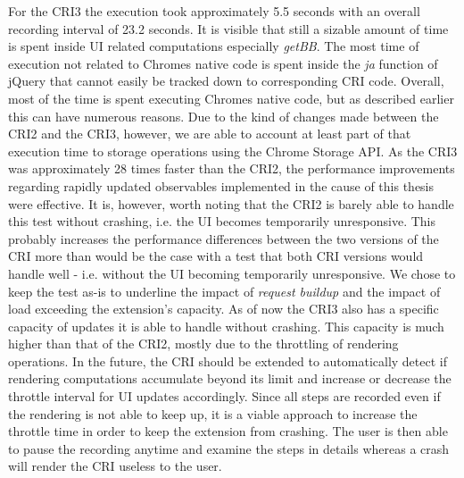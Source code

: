 	For the CRI3 the execution took approximately 5.5 seconds with an overall recording interval of 23.2 seconds. It is visible that still a sizable amount of time is spent inside UI related computations especially \emph{getBB}. The most time of execution not related to Chromes native code is spent inside the \emph{ja} function of jQuery that cannot easily be tracked down to corresponding CRI code. Overall, most of the time is spent executing Chromes native code, but as described earlier this can have numerous reasons. Due to the kind of changes made between the CRI2 and the CRI3, however, we are able to account at least part of that execution time to storage operations using the Chrome Storage API. 
	As the CRI3 was approximately 28 times faster than the CRI2, the performance improvements regarding rapidly updated observables implemented in the cause of this thesis were effective. It is, however, worth noting that the CRI2 is barely able to handle this test without crashing, i.e. the UI becomes temporarily unresponsive. This probably increases the performance differences between the two versions of the CRI more than would be the case with a test that both CRI versions would handle well - i.e. without the UI becoming temporarily unresponsive. We chose to keep the test as-is to underline the impact of \emph{request buildup} and the impact of load exceeding the extension's capacity.
	As of now the CRI3 also has a specific capacity of updates it is able to handle without crashing. This capacity is much higher than that of the CRI2, mostly due to the throttling of rendering operations. In the future, the CRI should be extended to automatically detect if rendering computations accumulate beyond its limit and increase or decrease the throttle interval for UI updates accordingly. Since all steps are recorded even if the rendering is not able to keep up, it is a viable approach to increase the throttle time in order to keep the extension from crashing. The user is then able to pause the recording anytime and examine the steps in details whereas a crash will render the CRI useless to the user.
	
